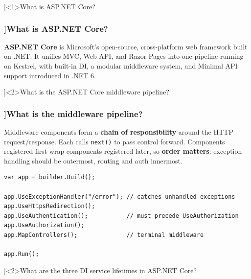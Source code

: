 
\QuestionSlide[\CategoryBadge[AspNetColor!20]{ASP.NET Core}]<1>{What is ASP.NET Core?}

\begin{frame}[fragile]
  \frametitle{\AnswerTitle[\CategoryBadge[AspNetColor!20]{ASP.NET Core}]{What is ASP.NET Core?}}

  {\footnotesize
  \textbf{ASP.NET Core} is Microsoft's open-source, cross-platform web framework built on .NET. It unifies MVC, Web API, and Razor Pages into one pipeline running on Kestrel, with built-in DI, a modular middleware system, and Minimal API support introduced in .NET 6.
  }
\end{frame}

\QuestionSlide[\CategoryBadge[AspNetColor!20]{ASP.NET Core}]<2>{What is the ASP.NET Core middleware pipeline?}

\begin{frame}[fragile]
  \frametitle{\AnswerTitle[\CategoryBadge[AspNetColor!20]{ASP.NET Core}]{What is the middleware pipeline?}}

  {\footnotesize
  Middleware components form a \textbf{chain of responsibility} around the HTTP request/response. Each calls \texttt{next()} to pass control forward. Components registered first wrap components registered later, so \textbf{order matters}: exception handling should be outermost, routing and auth innermost.
  }

  \begin{verbatim}
var app = builder.Build();

app.UseExceptionHandler("/error"); // catches unhandled exceptions
app.UseHttpsRedirection();
app.UseAuthentication();           // must precede UseAuthorization
app.UseAuthorization();
app.MapControllers();              // terminal middleware

app.Run();
  \end{verbatim}
\end{frame}

\QuestionSlide[\CategoryBadge[AspNetColor!20]{ASP.NET Core}]<2>{What are the three DI service lifetimes in ASP.NET Core?}

